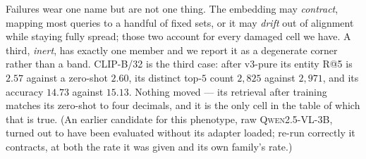Failures wear one name but are not one thing. The embedding may \emph{contract}, mapping most
queries to a handful of fixed sets, or it may \emph{drift} out of alignment while staying fully
spread; those two account for every damaged cell we have. A third, \emph{inert}, has exactly one
member and we report it as a degenerate corner rather than a band. \textsc{CLIP-B/32} is the third
case: after v3-pure its entity R@5 is $2.57$ against a zero-shot $2.60$, its distinct top-$5$
count $2{,}825$ against $2{,}971$, and its accuracy $14.73$ against $15.13$. Nothing moved --- its retrieval after training matches its
zero-shot to four decimals, and it is the only cell in the table of which that is true. (An
earlier candidate for this phenotype, raw \textsc{Qwen2.5-VL-3B}, turned out to have been
evaluated without its adapter loaded; re-run correctly it contracts, at both the rate it was
given and its own family's rate.)

